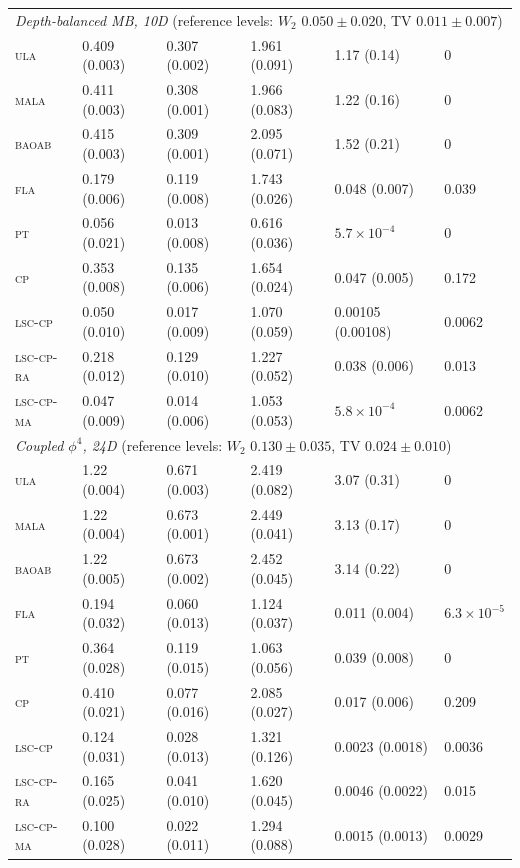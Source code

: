 \documentclass[11pt]{article}
\begin{document}
\begin{table}[p]
\begin{tabular}{llllll}
\midrule
\multicolumn{6}{l}{\emph{Depth-balanced MB, 10D} \hfill (reference levels: $W_2$ $0.050\pm0.020$, TV $0.011\pm0.007$)}\\
\textsc{ula}   & 0.409 (0.003) & 0.307 (0.002) & 1.961 (0.091) & 1.17 (0.14) & 0\\
\textsc{mala}  & 0.411 (0.003) & 0.308 (0.001) & 1.966 (0.083) & 1.22 (0.16) & 0\\
\textsc{baoab} & 0.415 (0.003) & 0.309 (0.001) & 2.095 (0.071) & 1.52 (0.21) & 0\\
\textsc{fla}   & 0.179 (0.006) & 0.119 (0.008) & 1.743 (0.026) & 0.048 (0.007) & 0.039\\
\textsc{pt}    & 0.056 (0.021) & 0.013 (0.008) & 0.616 (0.036) & $5.7\times10^{-4}$ & 0\\
\textsc{cp}    & 0.353 (0.008) & 0.135 (0.006) & 1.654 (0.024) & 0.047 (0.005) & 0.172\\
\textsc{lsc-cp} & 0.050 (0.010) & 0.017 (0.009) & 1.070 (0.059) & 0.00105 (0.00108) & 0.0062\\
\textsc{lsc-cp-ra} & 0.218 (0.012) & 0.129 (0.010) & 1.227 (0.052) & 0.038 (0.006) & 0.013\\
\textsc{lsc-cp-ma} & 0.047 (0.009) & 0.014 (0.006) & 1.053 (0.053) & $5.8\times10^{-4}$ & 0.0062\\
\midrule
\multicolumn{6}{l}{\emph{Coupled $\phi^4$, 24D} \hfill (reference levels: $W_2$ $0.130\pm0.035$, TV $0.024\pm0.010$)}\\
\textsc{ula}   & 1.22 (0.004) & 0.671 (0.003) & 2.419 (0.082) & 3.07 (0.31) & 0\\
\textsc{mala}  & 1.22 (0.004) & 0.673 (0.001) & 2.449 (0.041) & 3.13 (0.17) & 0\\
\textsc{baoab} & 1.22 (0.005) & 0.673 (0.002) & 2.452 (0.045) & 3.14 (0.22) & 0\\
\textsc{fla}   & 0.194 (0.032) & 0.060 (0.013) & 1.124 (0.037) & 0.011 (0.004) & $6.3\times10^{-5}$\\
\textsc{pt}    & 0.364 (0.028) & 0.119 (0.015) & 1.063 (0.056) & 0.039 (0.008) & 0\\
\textsc{cp}    & 0.410 (0.021) & 0.077 (0.016) & 2.085 (0.027) & 0.017 (0.006) & 0.209\\
\textsc{lsc-cp} & 0.124 (0.031) & 0.028 (0.013) & 1.321 (0.126) & 0.0023 (0.0018) & 0.0036\\
\textsc{lsc-cp-ra} & 0.165 (0.025) & 0.041 (0.010) & 1.620 (0.045) & 0.0046 (0.0022) & 0.015\\
\textsc{lsc-cp-ma} & 0.100 (0.028) & 0.022 (0.011) & 1.294 (0.088) & 0.0015 (0.0013) & 0.0029\\

\end{tabular}
\end{table}
\end{document}
